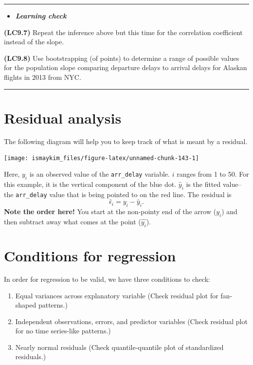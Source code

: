 \documentclass[]{tufte-book}
\let\oldrule=\rule
\renewcommand{\rule}[1]{\oldrule{\linewidth}}
\providecommand{\tightlist}{%
  \setlength{\itemsep}{0pt}\setlength{\parskip}{0pt}}
\newenvironment{rmdblock}[1]
  {\begin{shaded*}
  \begin{itemize}
  \renewcommand{\labelitemi}{
    \raisebox{-.7\height}[0pt][0pt]{
    }
  }
  \item
  }
  {
  \end{itemize}
  \end{shaded*}
  }
\newenvironment{learncheck}
  {\begin{rmdblock}{warning}}
  {\end{rmdblock}}
\begin{document}
\begin{center}\rule{0.5\linewidth}{\linethickness}\end{center}

\begin{learncheck}
\textbf{\emph{Learning check}}
\end{learncheck}

\textbf{(LC9.7)} Repeat the inference above but this time for the
correlation coefficient instead of the slope.

\textbf{(LC9.8)} Use bootstrapping (of points) to determine a range of
possible values for the population slope comparing departure delays to
arrival delays for Alaskan flights in 2013 from NYC.

\begin{center}\rule{0.5\linewidth}{\linethickness}\end{center}

\section{Residual analysis}\label{resid}

The following diagram will help you to keep track of what is meant by a
residual.

\begin{center}\texttt{[image: ismaykim\_files/figure-latex/unnamed-chunk-143-1]} \end{center}

Here, \(y_i\) is an observed value of the \texttt{arr\_delay} variable.
\(i\) ranges from 1 to 50. For this example, it is the vertical
component of the blue dot. \(\hat{y}_i\) is the fitted value--the
\texttt{arr\_delay} value that is being pointed to on the red line. The
residual is \[\hat{\epsilon}_i = y_i - \hat{y}_i.\] \textbf{Note the
order here!} You start at the non-pointy end of the arrow (\(y_i\)) and
then subtract away what comes at the point (\(\hat{y_i}\)).

\section{Conditions for regression}\label{conditions-for-regression}

In order for regression to be valid, we have three conditions to check:

\begin{enumerate}
\def\labelenumi{\arabic{enumi}.}
\tightlist
\item
  Equal variances across explanatory variable (Check residual plot for
  fan-shaped patterns.)
\item
  Independent observations, errors, and predictor variables (Check
  residual plot for no time series-like patterns.)
\item
  Nearly normal residuals (Check quantile-quantile plot of standardized
  residuals.)
\end{enumerate}
\end{document}
